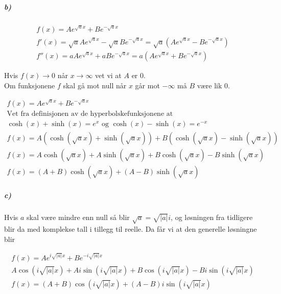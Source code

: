 \documentclass[11pt, A4paper,norsk]{article}
\begin{document}
			\subparagraph{b)}
				\begin{gather}
f(x) = Ae^{\sqrt{a}x} + Be^{-\sqrt{a}x} \\
f'(x) = \sqrt{a}Ae^{\sqrt{a}x} - \sqrt{a}Be^{-\sqrt{a}x} = \sqrt{a}\left(Ae^{\sqrt{a}x} - Be^{-\sqrt{a}x}\right) \\
f''(x) = aAe^{\sqrt{a}x} + aBe^{-\sqrt{a}x} = a\left( Ae^{\sqrt{a}x} + Be^{-\sqrt{a}x} \right)
				\end{gather}
				\begin{flushleft}
Hvis $f(x) \rightarrow 0$ når $x \rightarrow \infty$ vet vi at $A$ er $0$. \\
Om funksjonene $f$ skal gå mot null når $x$ går mot $-\infty$ må $B$ være lik $0$.
				\end{flushleft}
				\begin{gather}
f(x) = Ae^{\sqrt{a}x} + Be^{-\sqrt{a}x} \\
\text{Vet fra definisjonen av de hyperbolskefunksjonene at} \nonumber \\ \text{$\cosh(x) + \sinh(x) = e^{x}$ og $\cosh(x) - \sinh(x) = e^{-x}$} \nonumber \\
f(x) = A(\cosh(\sqrt{a}x) + \sinh(\sqrt{a}x)) + B(\cosh(\sqrt{a}x) - \sinh(\sqrt{a}x)) \\
f(x) = A\cosh(\sqrt{a}x) + A\sinh(\sqrt{a}x) + B\cosh(\sqrt{a}x) - B\sinh(\sqrt{a}x) \\
f(x) = (A + B)\cosh(\sqrt{a}x) + (A - B)\sinh(\sqrt{a}x)
				\end{gather}










			\subparagraph{c)}
				\begin{flushleft}
Hvis $a$ skal være mindre enn null så blir $\sqrt{a} = \sqrt{|a|}i$, og løsningen fra tidligere blir da med komplekse tall i tillegg til reelle. Da får vi at den generelle løsningne blir
				\end{flushleft}
				\begin{gather}
f(x) = Ae^{i\sqrt{|a|}x} + Be^{-i\sqrt{|a|}x} \\
A\cos(i\sqrt{|a|}x) + Ai\sin(i\sqrt{|a|}x) + B\cos(i\sqrt{|a|}x) - Bi\sin(i\sqrt{|a|}x) \\
f(x) = (A + B)\cos(i\sqrt{|a|}x) + (A - B)i\sin(i\sqrt{|a|}x)
				\end{gather}
\end{document}
